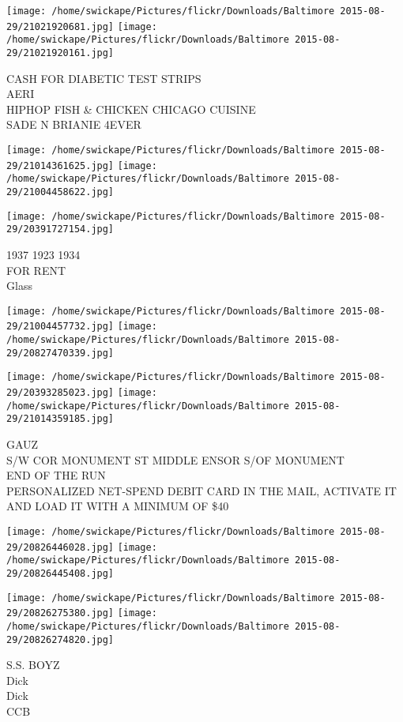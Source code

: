 \documentclass[10pt,letterpaper]{article}
\begin{document}
\texttt{[image: /home/swickape/Pictures/flickr/Downloads/Baltimore 2015-08-29/21021920681.jpg]}
\texttt{[image: /home/swickape/Pictures/flickr/Downloads/Baltimore 2015-08-29/21021920161.jpg]}

CASH FOR DIABETIC TEST STRIPS\\
AERI\\
HIPHOP FISH \& CHICKEN CHICAGO CUISINE\\
SADE N BRIANIE 4EVER
\pagebreak

\texttt{[image: /home/swickape/Pictures/flickr/Downloads/Baltimore 2015-08-29/21014361625.jpg]}
\texttt{[image: /home/swickape/Pictures/flickr/Downloads/Baltimore 2015-08-29/21004458622.jpg]}

\vspace{0.25in}
\texttt{[image: /home/swickape/Pictures/flickr/Downloads/Baltimore 2015-08-29/20391727154.jpg]}

1937 1923 1934\\
FOR RENT\\
Glass
\pagebreak

\texttt{[image: /home/swickape/Pictures/flickr/Downloads/Baltimore 2015-08-29/21004457732.jpg]}
\texttt{[image: /home/swickape/Pictures/flickr/Downloads/Baltimore 2015-08-29/20827470339.jpg]}

\texttt{[image: /home/swickape/Pictures/flickr/Downloads/Baltimore 2015-08-29/20393285023.jpg]}
\texttt{[image: /home/swickape/Pictures/flickr/Downloads/Baltimore 2015-08-29/21014359185.jpg]}

GAUZ\\
S/W COR MONUMENT ST MIDDLE ENSOR S/OF MONUMENT\\
END OF THE RUN\\
PERSONALIZED NET{-}SPEND DEBIT CARD IN THE MAIL, ACTIVATE IT AND LOAD IT WITH A MINIMUM OF \$40
\pagebreak

\texttt{[image: /home/swickape/Pictures/flickr/Downloads/Baltimore 2015-08-29/20826446028.jpg]}
\texttt{[image: /home/swickape/Pictures/flickr/Downloads/Baltimore 2015-08-29/20826445408.jpg]}

\texttt{[image: /home/swickape/Pictures/flickr/Downloads/Baltimore 2015-08-29/20826275380.jpg]}
\texttt{[image: /home/swickape/Pictures/flickr/Downloads/Baltimore 2015-08-29/20826274820.jpg]}

S.S. BOYZ\\
Dick\\
Dick\\
CCB
\pagebreak
\end{document}
